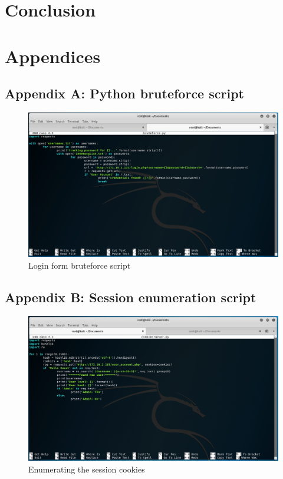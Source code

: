 \documentclass{report}
\begin{document}
\chapter{Conclusion}

\chapter{Appendices}
\section{Appendix A: Python bruteforce script}
\begin{figure}[!htb]
	\centering
	\includegraphics[scale=0.4]{img/bruteforcescript.png}
	\caption{Login form bruteforce script}
\end{figure}
\section{Appendix B: Session enumeration script}
\begin{figure}[!htb]
	\centering
	\includegraphics[scale=0.4]{img/cookiescript.png}
	\caption{Enumerating the session cookies}
\end{figure}


\end{document}
